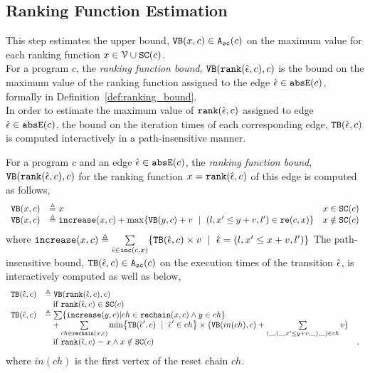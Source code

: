   \subsection{Ranking Function Estimation}
  This step estimates the upper bound, ${\mathtt{VB}}(x, c) \in {\ensuremath{\mathtt{A_{sc}}}}(c)$
  on the maximum value for each ranking function  $x \in  \mathcal{V} \cup \mathtt{SC}(c)$.
  \\
  For a program $c$, the \emph{ranking function bound},
  ${\mathtt{VB}}(\mathtt{rank}(\hat{\mathtt{\epsilon}{}}, c), c)$ is 
  the bound on the maximum value of the ranking function  
  assigned to the edge $\hat{\mathtt{\epsilon}{}} \in \mathtt{abs}{\mathtt{E}}(c)$, formally in Definition~\ref{def:ranking_bound}.
  \\
  In order to estimate the maximum value of $\mathtt{rank}(\hat{\mathtt{\epsilon}{}}, c)$ assigned to edge $\hat{\mathtt{\epsilon}{}} \in \mathtt{abs}{\mathtt{E}}(c)$,
  the bound on the iteration times of each corresponding edge, ${\mathtt{TB}}(\hat{\mathtt{\epsilon}{}}, c)$ 
  is computed interactively in a path-insensitive manner.
  \begin{defn}
    \label{def:ranking_bound}
  For a program $c$ and an edge $\hat{\mathtt{\epsilon}{}} \in \mathtt{abs}{\mathtt{E}}(c)$,
  the \emph{ranking function bound}, 
  ${\mathtt{VB}}(\mathtt{rank}(\hat{\mathtt{\epsilon}{}}, c), c)$ for the ranking function $x = \mathtt{rank}(\hat{\mathtt{\epsilon}{}}, c)$
  of this edge
  is computed as follows,
    \[ 
  \begin{array}{lll}
    \varinvar(x, c) & \triangleq x & x \in \scvar(c) \\
    \varinvar(x, c) & \triangleq \incrs(x, c) + \max\left\{\varinvar(y, c) + v ~\mid~ (l, x' \leq y + v, l') \in \reset(c, x) \right\} & x \notin \scvar(c)
  \end{array}
  \]
  where $\mathtt{increase}(x, c) \triangleq \sum\limits_{\hat{\mathtt{\epsilon}{}} \in \mathtt{inc}(c, x)}\{{\mathtt{TB}}(\hat{\mathtt{\epsilon}{}}, c) \times v ~\mid~ \hat{\mathtt{\epsilon}{}} = (l, x' \leq x + v, l')\}$
  The path-insensitive bound, ${\mathtt{TB}}(\hat{\mathtt{\epsilon}{}}, c) \in {\ensuremath{\mathtt{A_{sc}}}}(c)$  on the execution times of the transition $\hat{\mathtt{\epsilon}{}}$, is interactively computed as well as below,
\[ 
\begin{array}{lll}
  \absclr(\absevent, c) 
  & \triangleq \varinvar(\locbound(\absevent, c), c)  &  \\
  & \quad \text{if} ~ \locbound(\absevent, c) \in \scvar(c) & \\
  \absclr(\absevent, c) 
  & \triangleq
    \sum \left\{ \incrs(y, c) | ch \in \resetchain(x, c) \land y \in ch \right\} & \\
    & \quad + 
  \sum\limits_{ch \in \resetchain(x, c)}
  \min \left\{\absclr(\absevent', c) ~\mid~ \absevent' \in ch\right\} \times 
  \big(\varinvar(in(ch), c) 
  + \sum\limits_{(\_, (\_, x' \leq y + v, \_), \_) \in ch} v \big) & \\
  &  \quad \text{if} ~\locbound(\absevent, c) = x \land x \notin \scvar(c) & ,
\end{array}
  \]
 where $in(ch)$ is the first vertex of the reset chain $ch$.
\end{defn}
